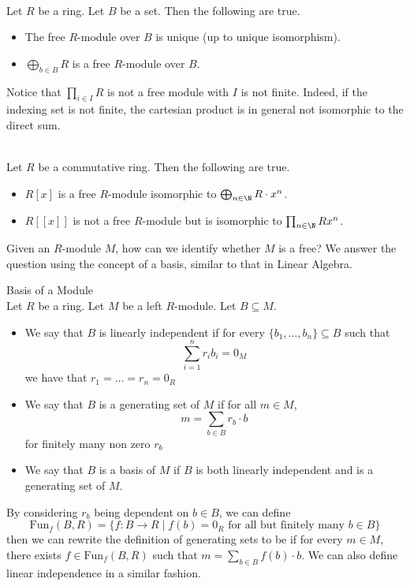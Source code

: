 \documentclass[a4paper]{article}
\begin{document}
\begin{lmm}{}{}\\
Let $R$ be a ring. Let $B$ be a set. Then the following are true. 
\begin{itemize}
\item The free $R$-module over $B$ is unique (up to unique isomorphism). 
\item $\bigoplus_{b\in B}R$ is a free $R$-module over $B$. 
\end{itemize}
\end{lmm}

Notice that $\prod_{i\in I}R$ is not a free module with $I$ is not finite. Indeed, if the indexing set is not finite, the cartesian product is in general not isomorphic to the direct sum. 

\begin{eg}{}{}\\
Let $R$ be a commutative ring. Then the following are true. 
\begin{itemize}
\item $R[x]$ is a free $R$-module isomorphic to $\bigoplus_{n\in\N}R\cdot x^n$. 
\item $R[[x]]$ is not a free $R$-module but is isomorphic to $\prod_{n\in\N}Rx^n$. 
\end{itemize}
\end{eg}

Given an $R$-module $M$, how can we identify whether $M$ is a free? We answer the question using the concept of a basis, similar to that in Linear Algebra. 

\begin{defn}{Basis of a Module}{}\\
Let $R$ be a ring. Let $M$ be a left $R$-module. Let $B\subseteq M$. 
\begin{itemize}
\item We say that $B$ is linearly independent if for every $\{b_1,\dots,b_n\}\subseteq B$ such that $$\sum_{i=1}^nr_ib_i=0_M$$ we have that $r_1=\dots=r_n=0_R$
\item We say that $B$ is a generating set of $M$ if for all $m\in M$, $$m=\sum_{b\in B}r_b\cdot b$$ for finitely many non zero $r_b$
\item We say that $B$ is a basis of $M$ if $B$ is both linearly independent and is a generating set of $M$. 
\end{itemize}
\end{defn}

By considering $r_b$ being dependent on $b\in B$, we can define $$\text{Fun}_f(B,R)=\{f:B\to R\;|\;f(b)=0_R\text{ for all but finitely many }b\in B\}$$ then we can rewrite the definition of generating sets to be if for every $m\in M$, there exists $f\in\text{Fun}_f(B,R)$ such that $m=\sum_{b\in B}f(b)\cdot b$. We can also define linear independence in a similar fashion. \\
\end{document}
